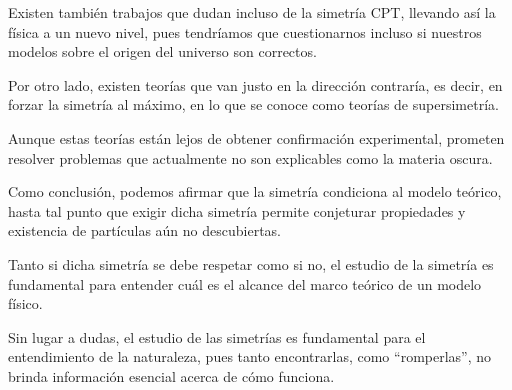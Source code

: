 Existen también trabajos que dudan incluso de la simetría CPT, llevando así la física a un nuevo nivel, pues tendríamos que cuestionarnos incluso si nuestros modelos sobre el origen del universo son correctos.

Por otro lado, existen teorías que van justo en la dirección contraría, es decir, en forzar la simetría al máximo, en lo que se conoce como teorías de supersimetría.

Aunque estas teorías están lejos de obtener confirmación experimental, prometen resolver problemas que actualmente no son explicables como la materia oscura.

Como conclusión, podemos afirmar que la simetría condiciona al modelo teórico, hasta tal punto que exigir dicha simetría permite conjeturar propiedades y existencia de partículas aún no descubiertas.

Tanto si dicha simetría se debe respetar como si no, el estudio de la simetría es fundamental para entender cuál es el alcance del marco teórico de un modelo físico.

Sin lugar a dudas, el estudio de las simetrías es fundamental para el entendimiento de la naturaleza, pues tanto encontrarlas, como ``romperlas'', no brinda información esencial acerca de cómo funciona.
